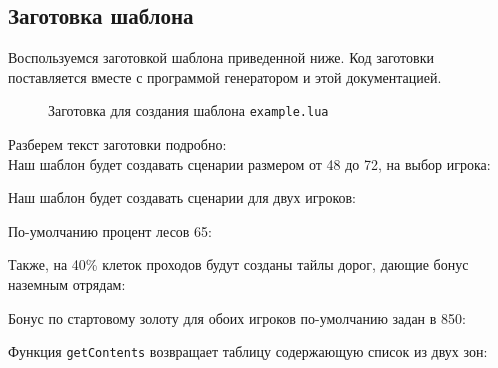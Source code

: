 \subsection{Заготовка шаблона}
Воспользуемся заготовкой шаблона приведенной ниже. Код заготовки поставляется вместе с программой генератором и этой документацией.

\begin{figure}[H]

\caption{Заготовка для создания шаблона \texttt{example.lua}}
\end{figure}

Разберем текст заготовки подробно:\\
Наш шаблон будет создавать сценарии размером от 48 до 72, на выбор игрока:
\begin{figure}[H]

\end{figure}

Наш шаблон будет создавать сценарии для двух игроков:

\begin{figure}[H]

\end{figure}

По-умолчанию процент лесов 65:

\begin{figure}[H]

\end{figure}

Также, на 40\% клеток проходов будут созданы тайлы дорог, дающие бонус наземным отрядам:

\begin{figure}[H]

\end{figure}

Бонус по стартовому золоту для обоих игроков по-умолчанию задан в 850:

\begin{figure}[H]

\end{figure}

Функция \texttt{getContents} возвращает таблицу содержающую список из двух зон:

\begin{figure}[H]

\end{figure}

